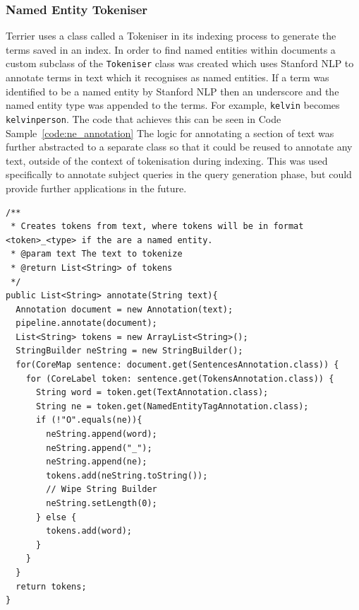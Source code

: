 \documentclass{l4proj}
\newcommand{\code}[1]{\texttt{#1}}
\newenvironment{codelisting}{\captionsetup{type=listing}}{}
\begin{document}
\subsubsection{Named Entity Tokeniser}
Terrier uses a class called a Tokeniser in its indexing process to generate the terms saved in an index. In order to find named entities within documents a custom subclass of the \code{Tokeniser} class was created which uses Stanford NLP to annotate terms in text which it recognises as named entities.
If a term was identified to be a named entity by Stanford NLP then an underscore and the named entity type was appended to the terms. For example, 
\code{kelvin} becomes \code{kelvin\textunderscore person}. The code that achieves this can be seen in Code Sample~\ref{code:ne_annotation}
The logic for annotating a section of text was further abstracted to a separate class so that it could be reused to annotate any text, outside of the context of tokenisation during indexing. This was used specifically to annotate subject queries in the query generation phase, but could provide further applications in the future.
\begin{codelisting}
\begin{verbatim}
/**
 * Creates tokens from text, where tokens will be in format <token>_<type> if the are a named entity.
 * @param text The text to tokenize
 * @return List<String> of tokens
 */
public List<String> annotate(String text){
  Annotation document = new Annotation(text);
  pipeline.annotate(document);
  List<String> tokens = new ArrayList<String>();
  StringBuilder neString = new StringBuilder();
  for(CoreMap sentence: document.get(SentencesAnnotation.class)) {
    for (CoreLabel token: sentence.get(TokensAnnotation.class)) {
	  String word = token.get(TextAnnotation.class);
	  String ne = token.get(NamedEntityTagAnnotation.class);
	  if (!"O".equals(ne)){
	    neString.append(word);
		neString.append("_");
		neString.append(ne);
		tokens.add(neString.toString());
		// Wipe String Builder
		neString.setLength(0);
	  } else {
	    tokens.add(word);
	  }
    }
  }
  return tokens;
}
\end{verbatim}
\label{code:ne_annotation}
\end{codelisting}
\end{document}
